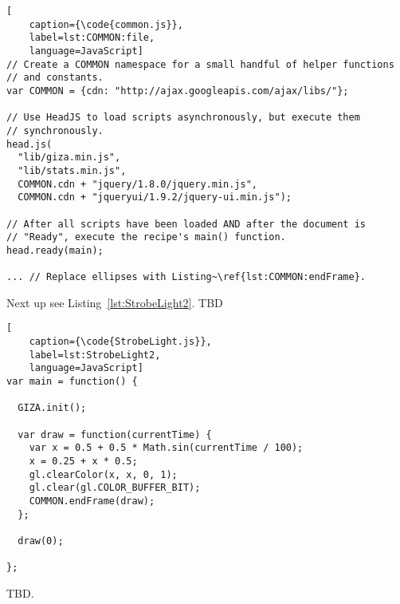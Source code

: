 \begin{lstlisting}[
    caption={\code{common.js}},
    label=lst:COMMON:file,
    language=JavaScript]
// Create a COMMON namespace for a small handful of helper functions
// and constants.
var COMMON = {cdn: "http://ajax.googleapis.com/ajax/libs/"};

// Use HeadJS to load scripts asynchronously, but execute them
// synchronously.
head.js(
  "lib/giza.min.js",
  "lib/stats.min.js",
  COMMON.cdn + "jquery/1.8.0/jquery.min.js",
  COMMON.cdn + "jqueryui/1.9.2/jquery-ui.min.js");

// After all scripts have been loaded AND after the document is
// "Ready", execute the recipe's main() function.
head.ready(main);

... // Replace ellipses with Listing~\ref{lst:COMMON:endFrame}.
\end{lstlisting} 

Next up see Listing~\ref{lst:StrobeLight2}.  TBD

\begin{lstlisting}[
    caption={\code{StrobeLight.js}},
    label=lst:StrobeLight2,
    language=JavaScript]
var main = function() {

  GIZA.init();

  var draw = function(currentTime) {
    var x = 0.5 + 0.5 * Math.sin(currentTime / 100);
    x = 0.25 + x * 0.5;
    gl.clearColor(x, x, 0, 1);
    gl.clear(gl.COLOR_BUFFER_BIT);
    COMMON.endFrame(draw);
  };

  draw(0);

};
\end{lstlisting} 

TBD.